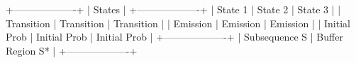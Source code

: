 +-------------------+
|       States      |
+-------------------+
|  State 1         |  State 2         |  State 3         |
|  Transition      |  Transition      |  Transition      |
|  Emission        |  Emission        |  Emission        |
|  Initial Prob    |  Initial Prob    |  Initial Prob    |
+-------------------+
| Subsequence S     | Buffer Region S* |
+-------------------+
